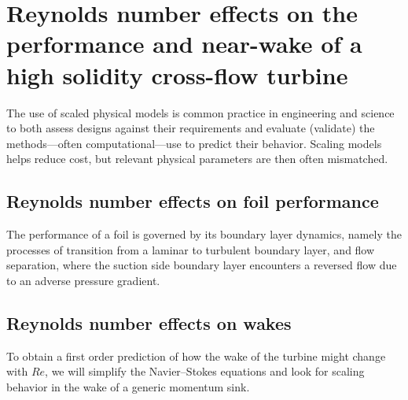 \chapter{Reynolds number effects on the performance and near-wake of a high
solidity cross-flow turbine} \label{chap:Re-dep}

The use of scaled physical models is common practice in engineering and science
to both assess designs against their requirements and evaluate (validate) the
methods---often computational---use to predict their behavior. Scaling models
helps reduce cost, but relevant physical parameters are then often mismatched.


\section{Reynolds number effects on foil performance}

The performance of a foil is governed by its boundary layer dynamics, namely the
processes of transition from a laminar to turbulent boundary layer, and flow
separation, where the suction side boundary layer encounters a reversed flow due
to an adverse pressure gradient.


\section{Reynolds number effects on wakes}

To obtain a first order prediction of how the wake of the turbine might change
with $Re$, we will simplify the Navier--Stokes equations and look for scaling
behavior in the wake of a generic momentum sink.